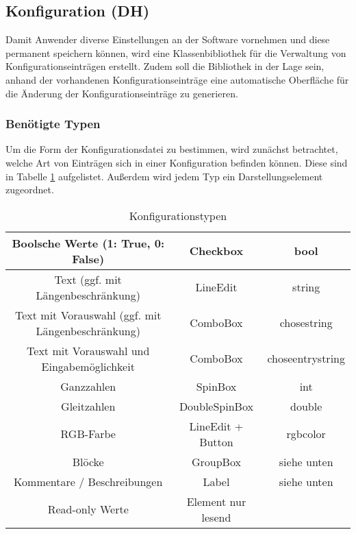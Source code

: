\subsection{Konfiguration (DH)}
Damit Anwender diverse Einstellungen an der Software vornehmen und diese permanent speichern können, wird eine Klassenbibliothek für die Verwaltung von Konfigurationseinträgen erstellt. Zudem soll die Bibliothek in der Lage sein, anhand der vorhandenen Konfigurationseinträge eine automatische Oberfläche für die Änderung der Konfigurationseinträge zu generieren.

\subsubsection{Benötigte Typen}
Um die Form der Konfigurationsdatei zu bestimmen, wird zunächst betrachtet, welche Art von Einträgen sich in einer Konfiguration befinden können. Diese sind in Tabelle \ref{tab:Konfigurationstypen} aufgelistet. Außerdem wird jedem Typ ein Darstellungselement zugeordnet.
\begin{table}[htb]
	\centering
	\caption{Konfigurationstypen}
		\begin{tabular}{|c|c|c|}
			\hline
			Boolsche Werte (1: True, 0: False) & Checkbox & bool \\ \hline
			Text (ggf. mit Längenbeschränkung) & LineEdit & string\\ \hline
			Text mit Vorauswahl (ggf. mit Längenbeschränkung) & ComboBox & chosestring\\ \hline
			Text mit Vorauswahl und Eingabemöglichkeit & ComboBox & choseentrystring \\ \hline
			Ganzzahlen & SpinBox & int\\ \hline
			Gleitzahlen & DoubleSpinBox & double\\ \hline
			RGB-Farbe & LineEdit + Button & rgbcolor\\ \hline
			Blöcke & GroupBox & siehe unten\\ \hline
			Kommentare / Beschreibungen & Label & siehe unten \\ \hline
			Read-only Werte & Element nur lesend & \\ \hline
		\end{tabular}
	\label{tab:Konfigurationstypen}
\end{table}

